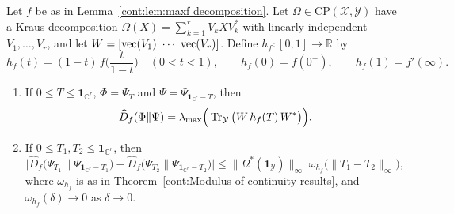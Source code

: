 \begin{theorem}\label{cont:thm:maxf}
Let $f$ be as in Lemma~\ref{cont:lem:maxf decomposition}. Let $\Omega\in \mathrm{CP}(\mathcal{X},\mathcal{Y})$ have a Kraus
decomposition $\Omega(X)=\sum_{k=1}^rV_kXV_k^*$ with linearly independent $V_1,\dots,V_r$, and let $W=[\vectorise(V_1)\ \cdots\ \vectorise(V_r)]$.
Define $h_f:[0,1]\to\mathbb{R}$ by
\[
h_f(t)=(1-t)\,f\Big(\frac{t}{1-t}\Big)\quad(0<t<1),\qquad h_f(0)=f(0^+),\qquad h_f(1)=f'(\infty).
\]
\begin{enumerate}
\item[(a)] If $0\leq T\leq\mathbf{1}_{\mathbb{C}^r}$, $\Phi=\Psi_T$ and $\Psi=\Psi_{\mathbf{1}_{\mathbb{C}^r}-T}$, then
\[
\widehat{D}_f(\Phi\|\Psi)=\lambda_{\max}\Big(\operatorname{Tr}_{\mathcal{Y}}\big(W\,h_f(T)\,W^*\big)\Big).
\]
\item[(b)] If $0\leq T_1,T_2\leq\mathbf{1}_{\mathbb{C}^r}$, then
\[
\Big|\widehat{D}_f\big(\Psi_{T_1}\big\|\Psi_{\mathbf{1}_{\mathbb{C}^r}-T_1}\big)-\widehat{D}_f\big(\Psi_{T_2}\big\|\Psi_{\mathbf{1}_{\mathbb{C}^r}-T_2}\big)\Big|
\leq\|\Omega^*(\mathbf{1}_{\mathcal{Y}})\|_\infty\;\omega_{h_f}\big(\|T_1-T_2\|_\infty\big),
\]
where $\omega_{h_f}$ is as in Theorem~\ref{cont:Modulus of continuity results},
and $\omega_{h_f}(\delta)\to0$ as $\delta\to0$.
\end{enumerate}
\end{theorem}
 
